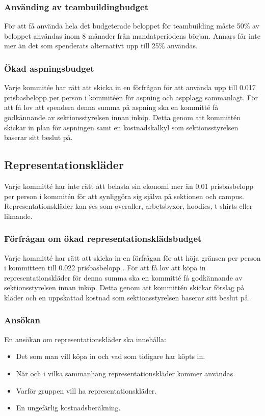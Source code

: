\documentclass[a4paper]{dtek}
\newcommand{\prisbasbelopp}[1]{
    #1 prisbasbelopp
    \ifdef{\nuvarandeprisbasbelopp}{
        \marginpar{
            \small{ \textbf{\roundandprint{\xintiexpr#1 * \nuvarandeprisbasbelopp\relax}kr}}
        }
    }{}
}
\begin{document}
\subsubsection{Använding av teambuildingbudget}
För att få använda hela det budgeterade beloppet för teambuilding måste 50\% av beloppet användas inom 8 månader från mandatperiodens början. Annars får inte mer än det som spenderats alternativt upp till 25\% användas.

\subsubsection{Ökad aspningsbudget}
Varje kommitée har rätt att skicka in en förfrågan för att använda upp till
0.017 prisbasbelopp per person i kommitéen för aspning och aspplagg sammanlagt. För att
få lov att spendera denna summa på aspning ska en kommitté få godkännande av
sektionsstyrelsen innan inköp. Detta genom att kommittén skickar in plan för aspningen samt
en kostnadskalkyl som sektionsstyrelsen baserar sitt beslut på.


\subsection{Representationskläder}
Varje kommitté har inte rätt att belasta sin ekonomi mer än \prisbasbelopp{0.01} per person i kommitén
för att synliggöra sig själva på sektionen och campus. 
Representationskläder kan ses som overaller, arbetsbyxor, hoodies, t-shirts eller liknande.

\subsubsection{Förfrågan om ökad representationsklädsbudget}
Varje kommitté har rätt att skicka in en förfrågan för att höja gränsen
per person i kommitteen till \prisbasbelopp{0.022}.
För att få lov att köpa in representationskläder för denna summa ska en 
kommitté få godkännande av sektionsstyrelsen innan inköp. Detta genom att kommittén
skickar förslag på kläder och en uppskattad kostnad som sektionsstyrelsen baserar
sitt beslut på.

\subsubsection{Ansökan}
En ansökan om representationskläder ska innehålla:
\begin{itemize}
  \item Det som man vill köpa in och vad som tidigare har köpts in.
  \item När och i vilka sammanhang representationskläder kommer användas.
  \item Varför gruppen vill ha representationskläder.
  \item En ungefärlig kostnadsberäkning.
\end{itemize}
\end{document}
